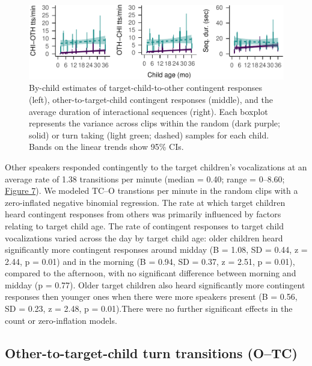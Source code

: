 \documentclass[floatsintext,man]{apa6}
\theoremstyle{definition}
\theoremstyle{definition}
\theoremstyle{definition}
\theoremstyle{remark}
\begin{document}
\begin{figure}
\centering
\includegraphics{Tseltal-CLE_files/figure-latex/fig7-1.pdf}
\caption{\label{fig:fig7}By-child estimates of target-child-to-other
contingent responses (left), other-to-target-child contingent responses
(middle), and the average duration of interactional sequences (right).
Each boxplot represents the variance across clips within the random
(dark purple; solid) or turn taking (light green; dashed) samples for
each child. Bands on the linear trends show 95\% CIs.}
\end{figure}

Other speakers responded contingently to the target children's
vocalizations at an average rate of 1.38 transitions per minute (median
= 0.40; range = 0--8.60; \protect\hyperlink{fig7}{Figure 7}). We modeled
TC--O transtions per minute in the random clips with a zero-inflated
negative binomial regression. The rate at which target children heard
contingent responses from others was primarily influenced by factors
relating to target child age. The rate of contingent responses to target
child vocalizations varied across the day by target child age: older
children heard significantly more contingent responses around midday (B
= 1.08, SD = 0.44, z = 2.44, p = 0.01) and in the morning (B = 0.94, SD
= 0.37, z = 2.51, p = 0.01), compared to the afternoon, with no
significant difference between morning and midday (p = 0.77). Older
target children also heard significantly more contingent responses then
younger ones when there were more speakers present (B = 0.56, SD = 0.23,
z = 2.48, p = 0.01).There were no further significant effects in the
count or zero-inflation models.

\subsection{Other-to-target-child turn transitions
(O--TC)}\label{other-to-target-child-turn-transitions-otc}
\end{document}
